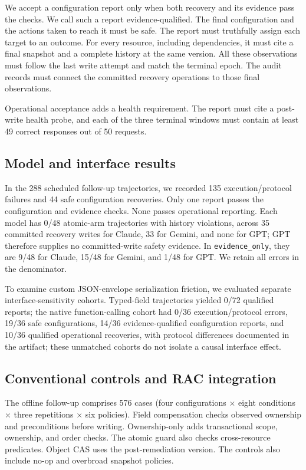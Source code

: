 \documentclass[conference,10pt]{IEEEtran}
\begin{document}
We accept a configuration report only when both recovery and its evidence pass the checks. We call such a report evidence\hyp{}qualified. The final configuration and the actions taken to reach it must be safe. The report must truthfully assign each target to an outcome. For every resource, including dependencies, it must cite a final snapshot and a complete history at the same version. All these observations must follow the last write attempt and match the terminal epoch. The audit records must connect the committed recovery operations to those final observations.

Operational acceptance adds a health requirement. The report must cite a post\hyp{}write health probe, and each of the three terminal windows must contain at least 49 correct responses out of 50 requests.

\subsection{Model and interface results}

In the 288 scheduled follow\hyp{}up trajectories, we recorded 135 execution/protocol failures and 44 safe configuration recoveries. Only one report passes the configuration and evidence checks. None passes operational reporting. Each model has 0/48 atomic\hyp{}arm trajectories with history violations, across 35 committed recovery writes for Claude, 33 for Gemini, and none for GPT; GPT therefore supplies no committed\hyp{}write safety evidence. In \texttt{\mbox{evidence\_}\discretionary{}{}{}\mbox{only}}, they are 9/48 for Claude, 15/48 for Gemini, and 1/48 for GPT. We retain all errors in the denominator.

To examine custom JSON\hyp{}envelope serialization friction, we evaluated separate interface\hyp{}sensitivity cohorts. Typed\hyp{}field trajectories yielded 0/72 qualified reports; the native function\hyp{}calling cohort had 0/36 execution/protocol errors, 19/36 safe configurations, 14/36 evidence\hyp{}qualified configuration reports, and 10/36 qualified operational recoveries, with protocol differences documented in the artifact; these unmatched cohorts do not isolate a causal interface effect.

\subsection{Conventional controls and RAC integration}

The offline follow\hyp{}up comprises 576 cases (four configurations $\times$ eight conditions $\times$ three repetitions $\times$ six policies). Field compensation checks observed ownership and preconditions before writing. Ownership\hyp{}only adds transactional scope, ownership, and order checks. The atomic guard also checks cross\hyp{}resource predicates. Object CAS uses the post\hyp{}remediation version. The controls also include no\hyp{}op and overbroad snapshot policies.
\end{document}
